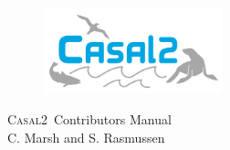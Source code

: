 \documentclass[a4paper,11pt,twoside,pdftex]{article}
\newcommand{\CNAME}{\textsc{Casal2}}
\newcommand{\cname}{\texttt{casal2}} %
\newcommand{\authors}{C. Marsh and S. Rasmussen}
\let\origdoublepage\cleardoublepage
\newcommand{\clearemptydoublepage}{%
  \clearpage
  {\pagestyle{empty}\origdoublepage}%
}
\begin{document}
 
\sloppy %


\begin{titlepage}
  \thispagestyle{empty} %
	\begin{center}

		\vspace{1cm}
		\begin{figure}[htp]
			 \includegraphics[height=2.5cm]{Figures/CASAL2.png}
		\end{figure}

		\vspace*{2.5cm}
		\Huge \CNAME\ Contributors Manual \\

		\vspace{2.0cm}
		\huge \authors \\ %


	
	\end{center}
\end{titlepage}


\fancyfoot[C]{\thepage}



\end{document}
